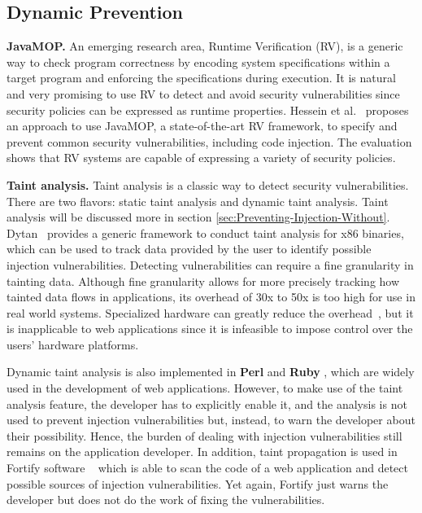 \subsection{Dynamic Prevention}

\textbf{JavaMOP.} An emerging research area, Runtime Verification
(RV), is a generic way to check program correctness by encoding
system specifications within a target program and enforcing the specifications
during execution. It is natural and very promising to use RV to
detect and avoid security vulnerabilities since security policies can
be expressed as runtime properties. Hessein et al.~\cite{PLAS12}
proposes an approach to use JavaMOP, a state-of-the-art RV framework,
to specify and prevent common security vulnerabilities, including code injection.
The evaluation shows that RV systems are capable of expressing a variety of
security policies.

\textbf{Taint analysis.} Taint analysis is a classic way to
detect security vulnerabilities. There are two flavors: static taint analysis and dynamic taint analysis. Taint analysis will be discussed more in section
\ref{sec:Preventing-Injection-Without}. Dytan~\cite{dytan} provides a generic framework to conduct taint analysis for x86 binaries, which can be used to track data provided by the user to identify possible injection vulnerabilities. Detecting vulnerabilities can require a fine granularity in tainting data. Although
fine granularity allows for more precisely tracking how tainted data
flows in applications, its overhead of 30x to 50x is too high for use in real
world systems. Specialized hardware can greatly reduce the
overhead~\cite{ASE}, but it is inapplicable to web applications
since it is infeasible to impose control over the users' hardware platforms.

\indent Dynamic taint analysis is also implemented in \textbf{Perl} \cite{perl} and \textbf{Ruby} \cite{ruby}, which are widely used in the development of web applications. However, to make use of the taint analysis feature, the developer has to explicitly enable it, and the analysis is not used to prevent injection vulnerabilities but, instead, to warn the developer about their possibility. Hence, the burden of dealing with injection vulnerabilities still remains on the application developer. In addition, taint propagation is used in Fortify software ~\cite{fortify} which is able to scan the code of a web application and detect possible sources of injection vulnerabilities. Yet again, Fortify just warns the developer but does not do the work of fixing the vulnerabilities.

